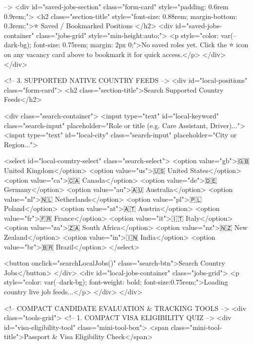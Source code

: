         -->
        <div id="saved-jobs-section" class="form-card" style="padding: 0.6rem 0.9rem;">
            <h2 class="section-title" style="font-size: 0.88rem; margin-bottom: 0.3rem;">⭐ Saved / Bookmarked
                Positions
            </h2>
            <div id="saved-jobs-container" class="jobs-grid" style="min-height:auto;">
                <p style="color: var(--dark-bg); font-size: 0.75rem; margin: 2px 0;">No saved roles yet. Click the ⭐
                    icon on any vacancy card above to bookmark it for quick access.</p>
            </div>
        </div>

        <!-- 3. SUPPORTED NATIVE COUNTRY FEEDS -->
        <div id="local-positions" class="form-card">
            <h2 class="section-title">Search Supported Country Feeds</h2>

            <div class="search-container">
                <input type="text" id="local-keyword" class="search-input"
                    placeholder="Role or title (e.g. Care Assistant, Driver)...">
                <input type="text" id="local-city" class="search-input" placeholder="City or Region...">

                <select id="local-country-select" class="search-select">
                    <option value="gb">🇬🇧 United Kingdom</option>
                    <option value="us">🇺🇸 United States</option>
                    <option value="ca">🇨🇦 Canada</option>
                    <option value="de">🇩🇪 Germany</option>
                    <option value="au">🇦🇺 Australia</option>
                    <option value="nl">🇳🇱 Netherlands</option>
                    <option value="pl">🇵🇱 Poland</option>
                    <option value="at">🇦🇹 Austria</option>
                    <option value="fr">🇫🇷 France</option>
                    <option value="it">🇮🇹 Italy</option>
                    <option value="za">🇿🇦 South Africa</option>
                    <option value="nz">🇳🇿 New Zealand</option>
                    <option value="in">🇮🇳 India</option>
                    <option value="br">🇧🇷 Brazil</option>
                </select>

                <button onclick="searchLocalJobs()" class="search-btn">Search Country Jobs</button>
            </div>
            <div id="local-jobs-container" class="jobs-grid">
                <p style="color: var(--dark-bg); font-weight: bold; font-size:0.75rem;">Loading country live job
                    feeds...</p>
            </div>
        </div>

        <!-- COMPACT CANDIDATE EVALUATION & TRACKING TOOLS -->
        <div class="tools-grid">
            <!-- 1. COMPACT VISA ELIGIBILITY QUIZ -->
            <div id="visa-eligibility-tool" class="mini-tool-box">
                <span class="mini-tool-title">Passport & Visa Eligibility Check</span>

